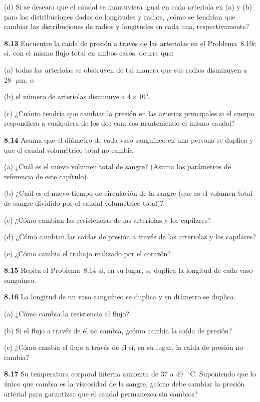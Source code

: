 \documentclass[12pt]{book}
\begin{document}
(d) Si se deseara que el caudal se mantuviera igual en cada arteriola en (a) y (b) para las distribuciones dadas de longitudes y radios, ¿cómo se tendrían que cambiar las distribuciones de radios y longitudes en cada una, respectivamente?

\textbf{8.13} Encuentre la caída de presión a través de las arteriolas en el Problema~8.10c si, con el mismo flujo total en ambos casos, ocurre que:

(a) todas las arteriolas se obstruyen de tal manera que sus radios disminuyen a $28\text{ }\mu\text{m}$, o

(b) el número de arteriolas disminuye a $4 \times 10^5$.

(c) ¿Cuánto tendría que cambiar la presión en las arterias principales si el cuerpo respondiera a cualquiera de los dos cambios manteniendo el mismo caudal?

\textbf{8.14} Asuma que el diámetro de cada vaso sanguíneo en una persona se duplica y que el caudal volumétrico total no cambia.

(a) ¿Cuál es el nuevo volumen total de sangre? (Asuma los parámetros de referencia de este capítulo).

(b) ¿Cuál es el nuevo tiempo de circulación de la sangre (que es el volumen total de sangre dividido por el caudal volumétrico total)?

(c) ¿Cómo cambian las resistencias de las arteriolas y los capilares?

(d) ¿Cómo cambian las caídas de presión a través de las arteriolas y los capilares?

(e) ¿Cómo cambia el trabajo realizado por el corazón?

\textbf{8.15} Repita el Problema~8.14 si, en su lugar, se duplica la longitud de cada vaso sanguíneo.

\textbf{8.16} La longitud de un vaso sanguíneo se duplica y su diámetro se duplica.

(a) ¿Cómo cambia la resistencia al flujo?

(b) Si el flujo a través de él no cambia, ¿cómo cambia la caída de presión?

(c) ¿Cómo cambia el flujo a través de él si, en su lugar, la caída de presión no cambia?

\textbf{8.17} Su temperatura corporal interna aumenta de $37$ a $40\text{ }^\circ\text{C}$. Suponiendo que lo único que cambia es la viscosidad de la sangre, ¿cómo debe cambiar la presión arterial para garantizar que el caudal permanezca sin cambios?
\end{document}
